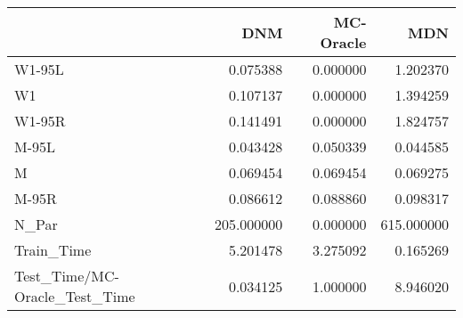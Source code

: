\begin{tabular}{lrrr}
\toprule
{} &         DNM &  MC-Oracle &         MDN \\
\midrule
W1-95L                        &    0.075388 &   0.000000 &    1.202370 \\
W1                            &    0.107137 &   0.000000 &    1.394259 \\
W1-95R                        &    0.141491 &   0.000000 &    1.824757 \\
M-95L                         &    0.043428 &   0.050339 &    0.044585 \\
M                             &    0.069454 &   0.069454 &    0.069275 \\
M-95R                         &    0.086612 &   0.088860 &    0.098317 \\
N\_Par                         &  205.000000 &   0.000000 &  615.000000 \\
Train\_Time                    &    5.201478 &   3.275092 &    0.165269 \\
Test\_Time/MC-Oracle\_Test\_Time &    0.034125 &   1.000000 &    8.946020 \\
\bottomrule
\end{tabular}
